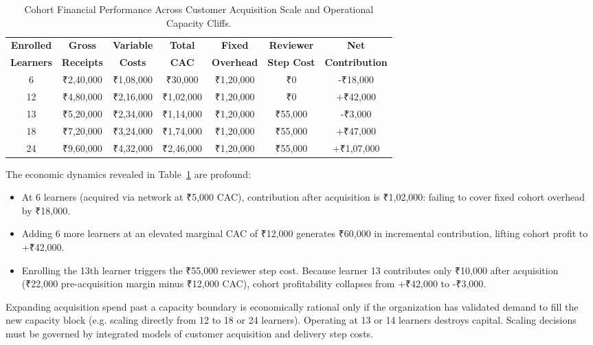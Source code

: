 \begin{table}[t]
\centering
\small
\caption{Cohort Financial Performance Across Customer Acquisition Scale and Operational Capacity Cliffs.}
\label{tab:capacity_cliff}
\begin{tabular}{ccccccc}
\hline\hline
\textbf{Enrolled} & \textbf{Gross} & \textbf{Variable} & \textbf{Total} & \textbf{Fixed} & \textbf{Reviewer} & \textbf{Net} \\
\textbf{Learners} & \textbf{Receipts} & \textbf{Costs} & \textbf{CAC} & \textbf{Overhead} & \textbf{Step Cost} & \textbf{Contribution} \\
\hline
6 & ₹2,40,000 & ₹1,08,000 & ₹30,000 & ₹1,20,000 & ₹0 & -₹18,000 \\
12 & ₹4,80,000 & ₹2,16,000 & ₹1,02,000 & ₹1,20,000 & ₹0 & +₹42,000 \\
13 & ₹5,20,000 & ₹2,34,000 & ₹1,14,000 & ₹1,20,000 & ₹55,000 & -₹3,000 \\
18 & ₹7,20,000 & ₹3,24,000 & ₹1,74,000 & ₹1,20,000 & ₹55,000 & +₹47,000 \\
24 & ₹9,60,000 & ₹4,32,000 & ₹2,46,000 & ₹1,20,000 & ₹55,000 & +₹1,07,000 \\
\hline\hline
\end{tabular}
\end{table}

The economic dynamics revealed in Table~\ref{tab:capacity_cliff} are profound:
\begin{itemize}[leftmargin=*,itemsep=1pt]
  \item At 6 learners (acquired via network at ₹5,000 CAC), contribution after acquisition is ₹1,02,000: failing to cover fixed cohort overhead by ₹18,000.
  \item Adding 6 more learners at an elevated marginal CAC of ₹12,000 generates ₹60,000 in incremental contribution, lifting cohort profit to +₹42,000.
  \item Enrolling the 13th learner triggers the ₹55,000 reviewer step cost. Because learner 13 contributes only ₹10,000 after acquisition (₹22,000 pre-acquisition margin minus ₹12,000 CAC), cohort profitability collapses from +₹42,000 to -₹3,000.
\end{itemize}

Expanding acquisition spend past a capacity boundary is economically rational only if the organization has validated demand to fill the new capacity block (e.g. scaling directly from 12 to 18 or 24 learners). Operating at 13 or 14 learners destroys capital. Scaling decisions must be governed by integrated models of customer acquisition and delivery step costs.

